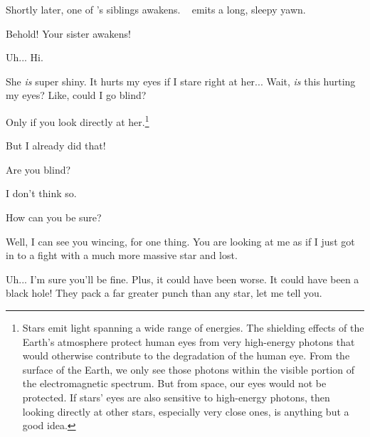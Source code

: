 \documentclass[main.tex]{subfiles}
\begin{document}
\par \nar Shortly later, one of \rmmaia's siblings awakens.  \rmelectra~ emits a long, sleepy yawn.

\par \Pleione Behold!  Your sister awakens!

\par \Electra  Uh... Hi.

\par \Maia She \textit{is} super shiny.  It hurts my eyes if I stare right at her... Wait, \textit{is} this hurting my eyes?  Like, could I go blind?

\par \Pleione Only if you look directly at her.\footnote{Stars emit light spanning a wide range of energies.  The shielding effects of the Earth's atmosphere protect human eyes from very high-energy photons that would otherwise contribute to the degradation of the human eye.  From the surface of the Earth, we only see those photons within the visible portion of the electromagnetic spectrum.  But from space, our eyes would not be protected.  If stars' eyes are also sensitive to high-energy photons, then looking directly at other stars, especially very close ones, is anything but a good idea.}

\par \Maia But I already did that!

\par \Pleione Are you blind?

\par \Maia I don't think so.

\par \Pleione How can you be sure?

\par \Maia Well, I can see you wincing, for one thing.  You are looking at me as if I just got in to a fight with a much more massive star and lost.

\par \Pleione Uh... I'm sure you'll be fine. Plus, it could have been worse.  It could have been a black hole!  They pack a far greater punch than any star, let me tell you.
\end{document}
